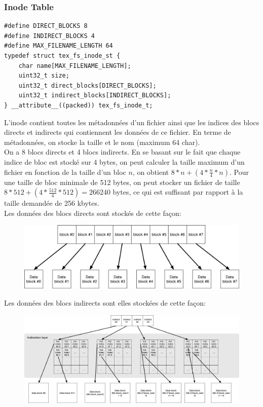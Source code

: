 \documentclass{article}
\begin{document}
\subsubsection{Inode Table}
\begin{verbatim}
#define DIRECT_BLOCKS 8
#define INDIRECT_BLOCKS 4
#define MAX_FILENAME_LENGTH 64
typedef struct tex_fs_inode_st {
    char name[MAX_FILENAME_LENGTH];
    uint32_t size;
    uint32_t direct_blocks[DIRECT_BLOCKS];
    uint32_t indirect_blocks[INDIRECT_BLOCKS];
} __attribute__((packed)) tex_fs_inode_t;
\end{verbatim}
L'inode contient toutes les métadonnées d'un fichier ainsi que les indices des blocs directs et indirects qui contiennent les données de ce fichier. En terme de métadonnées, on stocke la taille et le nom (maximum 64 char). \\

On a 8 blocs directs et 4 blocs indirects. En se basant sur le fait que chaque indice de bloc est stocké sur 4 bytes, on peut calculer la taille maximum d'un fichier en fonction de la taille d'un bloc $n$, on obtient $8 * n + (4 * \frac{n}{4} * n)$. Pour une taille de bloc minimale de 512 bytes, on peut stocker un fichier de taille $8 * 512 + (4 * \frac{512}{4} * 512)=266240$ bytes, ce qui est suffisant par rapport à la taille demandée de 256 kbytes.\\

Les données des blocs directs sont stockés de cette façon: \\
\begin{figure}[H]
	\centering
	\includegraphics[width=\textwidth]{FS_direct.png}
\end{figure}

Les données des blocs indirects sont elles stockées de cette façon: \\
\begin{figure}[H]
	\centering
	\includegraphics[width=\textwidth]{FS_indirect.png}
\end{figure}
\end{document}
